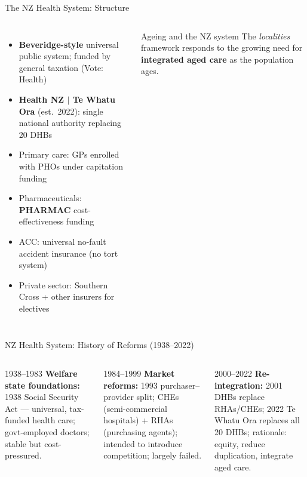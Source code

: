 \documentclass[aspectratio=169, 12pt]{beamer}
\begin{document}
\begin{frame}{The NZ Health System: Structure}
  \begin{columns}
      \footnotesize
      \begin{itemize}
        \item \textbf{Beveridge-style} universal public system; funded by general taxation (Vote: Health)
        \item \textbf{Health NZ $|$ Te Whatu Ora} (est.\ 2022): single national authority replacing 20 DHBs
        \item Primary care: GPs enrolled with PHOs under capitation funding
        \item Pharmaceuticals: \textbf{PHARMAC} cost-effectiveness funding
        \item ACC: universal no-fault accident insurance (no tort system)
        \item Private sector: Southern Cross + other insurers for electives
      \end{itemize}
      \begin{alertblock}{Ageing and the NZ system}
        \small The \textit{localities} framework responds to the growing need for \textbf{integrated aged care} as the population ages.
      \end{alertblock}
  \end{columns}
\end{frame}

\begin{frame}{NZ Health System: History of Reforms (1938--2022)}
  \begin{columns}
      \begin{block}{1938--1983}
        \footnotesize\textbf{Welfare state foundations:} 1938 Social Security Act — universal, tax-funded health care; govt-employed doctors; stable but cost-pressured.
      \end{block}
      \begin{block}{1984--1999}
        \footnotesize\textbf{Market reforms:} 1993 purchaser--provider split; CHEs (semi-commercial hospitals) + RHAs (purchasing agents); intended to introduce competition; largely failed.
      \end{block}
      \begin{alertblock}{2000--2022}
        \footnotesize\textbf{Re-integration:} 2001 DHBs replace RHAs/CHEs; 2022 Te Whatu Ora replaces all 20 DHBs; rationale: equity, reduce duplication, integrate aged care.
      \end{alertblock}
  \end{columns}
\end{frame}
\end{document}
